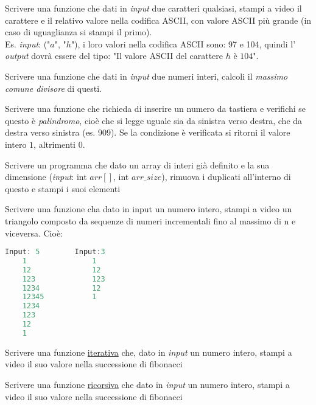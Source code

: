 \documentclass[addpoints,11pt]{exam}
\begin{document}
\begin{questions}
\question[1]
Scrivere una funzione che dati in \emph{input} due caratteri qualsiasi, stampi a video il carattere e il relativo valore nella codifica ASCII, con valore ASCII più grande (in caso di uguaglianza si stampi il primo). \\
Es. \emph{input}: ("$a$", "$h$"), i loro valori nella codifica ASCII sono: 97 e 104, quindi l' \emph{output} dovrà essere del tipo: "Il valore ASCII del carattere $h$ è $104$".
\makeemptybox{100pt}



\question[3]
Scrivere una funzione che dati in \emph{input} due numeri interi, calcoli il \emph{massimo comune divisore} di questi.
\makeemptybox{120pt}



\question[3]
Scrivere una funzione che richieda di inserire un numero da tastiera e verifichi se questo è \emph{palindromo}, cioè che si legge uguale sia da sinistra verso destra, che da destra verso sinistra (es. 909). Se la condizione è verificata si ritorni il valore intero $1$, altrimenti $0$.
\makeemptybox{150pt}



\question[3]
Scrivere un programma che dato un array di interi già definito e la sua dimensione (\emph{input}: int $arr[]$, int $arr\_size$), rimuova i duplicati all'interno di questo e stampi i suoi elementi
\makeemptybox{150pt}



\question[2]
Scrivere una funzione cha dato in input un numero intero, stampi a video un triangolo composto da sequenze di numeri incrementali fino al massimo di n e viceversa. Cioè: \\
\begin{minipage}[t]{0.5\linewidth}
	\begin{lstlisting}[language=C]
	Input: 5        Input:3
	1               1
	12              12
	123             123
	1234            12
	12345           1
	1234
	123
	12
	1\end{lstlisting}
\end{minipage}
\makeemptybox{150pt}



\question[2]
Scrivere una funzione \underline{iterativa} che, dato in \emph{input} un numero intero, stampi a video il suo valore nella successione di fibonacci

\makeemptybox{150pt}



\question[2]
Scrivere una funzione \underline{ricorsiva} che dato in \emph{input} un numero intero, stampi a video il suo valore nella successione di fibonacci


\end{questions}
\end{document}
